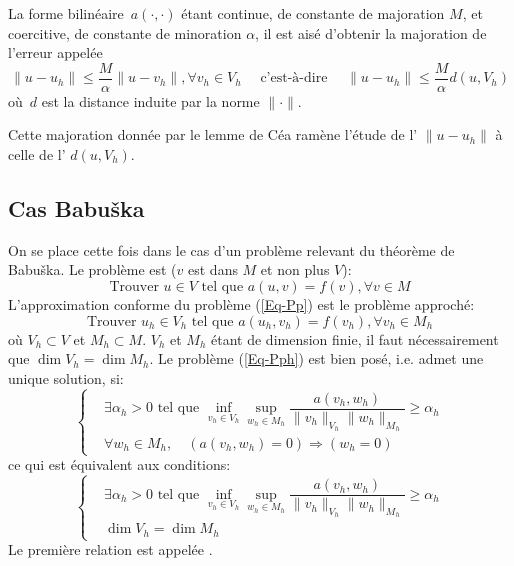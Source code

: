 \medskip
\begin{lemme}
La forme bilinéaire~$a(\cdot,\cdot)$ étant continue, de constante de majoration $M$, et coercitive, de constante de minoration $\alpha$, il est aisé d'obtenir la majoration de l'erreur appelée 
\begin{equation}
\|u-u_h\|\le\dfrac{M}{\alpha}\|u-v_h\|, \forall v_h\in V_h
\quad \text{ c'est-à-dire } \quad
\|u-u_h\|\le\dfrac{M}{\alpha}d(u,V_h)
\end{equation}
où~$d$ est la distance induite par la norme $\|\cdot\|$.
\end{lemme}

Cette majoration donnée par le lemme de Céa ramène l'étude de l' $\|u-u_h\|$ à celle de l' $d(u,V_h)$.


\medskip
\subsection{Cas Babuška}
On se place cette fois dans le cas d'un problème relevant du théorème de Babuška.
Le problème est ($v$ est dans $M$ et non plus $V$):
\begin{equation}\label{Eq-Pp}
\text{Trouver } u\in V \text{ tel que } a(u,v) = f(v), \forall v\in M
\end{equation}
L'approximation conforme du problème (\ref{Eq-Pp}) est le problème approché:
\begin{equation}\label{Eq-Pph}
\text{Trouver } u_h\in V_h \text{ tel que } a(u_h,v_h) = f(v_h), \forall v_h\in M_h
\end{equation}
où $V_h\subset V$ et $M_h\subset M$.
\medskipvm
{}
\medskipvm
$V_h$ et $M_h$ étant de dimension finie, il faut nécessairement que $\dim V_h=\dim M_h$.
\medskip
Le problème (\ref{Eq-Pph}) est bien posé, i.e. admet une unique solution, si:
\begin{equation}\left\{
\begin{aligned}
&\displaystyle\exists\alpha_h>0 \text{ tel que } \inf_{v_h\in V_h}\sup_{w_h\in M_h}\dfrac{a(v_h,w_h)}{\|v_h\|_{V_h}\|w_h\|_{M_h}}\ge\alpha_h\\
&\forall w_h\in M_h,\quad \left(a(v_h,w_h)=0\right)\Rightarrow(w_h=0)
\end{aligned}
\right.\end{equation}
ce qui est équivalent aux conditions:
\begin{equation}\left\{
\begin{aligned}
&\displaystyle\exists\alpha_h>0 \text{ tel que } \inf_{v_h\in V_h}\sup_{w_h\in M_h}\dfrac{a(v_h,w_h)}{\|v_h\|_{V_h}\|w_h\|_{M_h}}\ge\alpha_h\\
&\dim V_h=\dim M_h
\end{aligned}
\right.\end{equation}
Le première relation est appelée .


